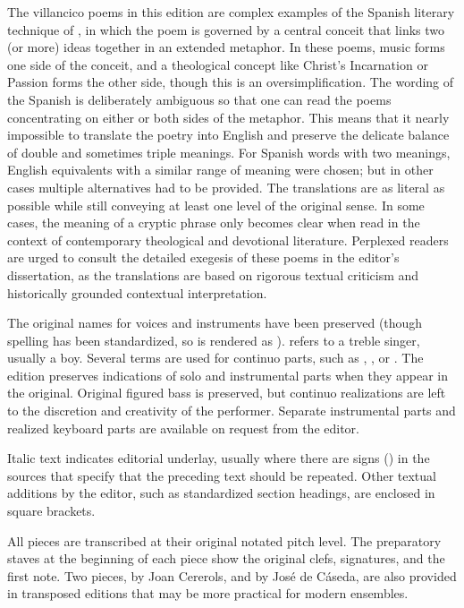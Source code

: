 The villancico poems in this edition are complex examples of the Spanish
literary technique of , in which the poem is governed by a
central conceit that links two (or more) ideas together in an extended
metaphor.%
    \Autocite{Gaylord:Poetry}
In these poems, music forms one side of the conceit, and a theological concept
like Christ's Incarnation or Passion forms the other side, though this is an
oversimplification.
The wording of the Spanish is deliberately ambiguous so that one can read the
poems concentrating on either or both sides of the metaphor.
This means that it nearly impossible to translate the poetry into English and
preserve the delicate balance of double and sometimes triple meanings.
For Spanish words with two meanings, English equivalents with a similar range of
meaning were chosen; but in other cases multiple alternatives had to be
provided.
The translations are as literal as possible while still conveying at least one
level of the original sense.
In some cases, the meaning of a cryptic phrase only becomes clear when read in
the context of contemporary theological and devotional literature.
Perplexed readers are urged to consult the detailed exegesis of these poems in
the editor's dissertation, as the translations are based on rigorous textual
criticism and historically grounded contextual interpretation.

The original names for voices and instruments have been preserved (though
spelling has been standardized, so  is rendered as
).
 refers to a treble singer, usually a boy.
Several terms are used for continuo parts, such as ,
, or .
The edition preserves indications of solo and instrumental parts when they
appear in the original.
Original figured bass is preserved, but continuo realizations are left to the
discretion and creativity of the performer.
Separate instrumental parts and realized keyboard parts are available on request
from the editor.

Italic text indicates editorial underlay, usually where there are signs
(\MSrepeat{}) in the sources that specify that the preceding text should
be repeated.
Other textual additions by the editor, such as standardized section headings, 
are enclosed in square brackets.

All pieces are transcribed at their original notated pitch level.
The preparatory staves at the beginning of each piece show the original clefs, 
signatures, and the first note.
Two pieces,  by Joan Cererols, and  by José de Cáseda, are also provided in transposed editions that
may be more practical for modern ensembles.

